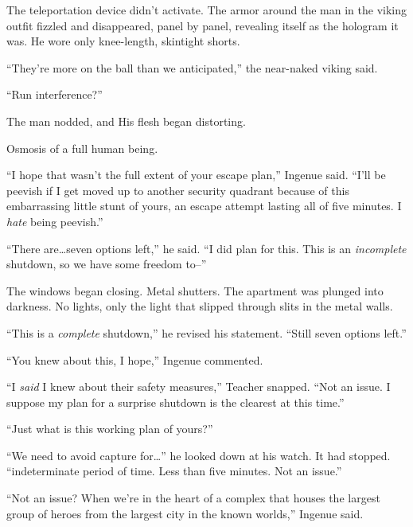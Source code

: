 The teleportation device didn't activate.  The armor around the man in the viking outfit fizzled and disappeared, panel by panel, revealing itself as the hologram it was.  He wore only knee-length, skintight shorts.



``They're more on the ball than we anticipated,'' the near-naked viking said.



``Run interference?''



The man nodded, and His flesh began distorting.



Osmosis of a full human being.



``I hope that wasn't the full extent of your escape plan,'' Ingenue said.  ``I'll be peevish if I get moved up to another security quadrant because of this embarrassing little stunt of yours, an escape attempt lasting all of five minutes.  I \emph{hate} being peevish.''



``There are\ldots seven options left,'' he said.  ``I did plan for this.  This is an \emph{incomplete} shutdown, so we have some freedom to--''



The windows began closing.  Metal shutters.  The apartment was plunged into darkness.  No lights, only the light that slipped through slits in the metal walls.



``This is a \emph{complete} shutdown,'' he revised his statement.  ``Still seven options left.''



``You knew about this, I hope,'' Ingenue commented.



``I \emph{said} I knew about their safety measures,'' Teacher snapped.  ``Not an issue.  I suppose my plan for a surprise shutdown is the clearest at this time.''



``Just what is this working plan of yours?''



``We need to avoid capture for\ldots'' he looked down at his watch.  It had stopped.  ``\ldotsAn indeterminate period of time.  Less than five minutes.  Not an issue.''



``Not an issue?  When we're in the heart of a complex that houses the largest group of heroes from the largest city in the known worlds,'' Ingenue said.




